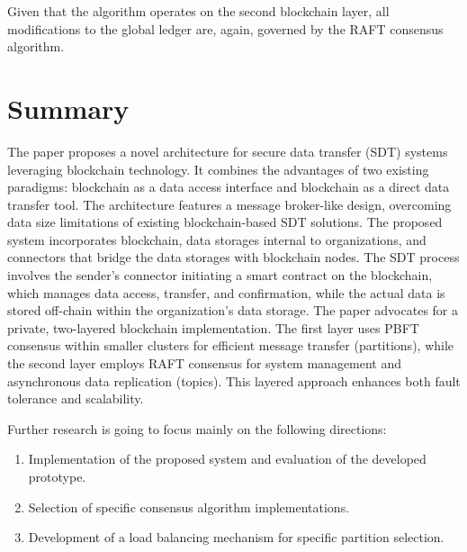 \documentclass[10pt]{llncs}
\begin{document}
Given that the algorithm operates on the second blockchain layer, all modifications to the global ledger are, again, governed by the RAFT consensus algorithm.

\section{Summary} \label{summary}

The paper proposes a novel architecture for secure data transfer (SDT) systems leveraging blockchain technology.
It combines the advantages of two existing paradigms: blockchain as a data access interface and blockchain as a direct data transfer tool.
The architecture features a message broker-like design, overcoming data size limitations of existing blockchain-based SDT solutions.
The proposed system incorporates blockchain, data storages internal to organizations, and connectors that bridge the data storages with blockchain nodes.
The SDT process involves the sender's connector initiating a smart contract on the blockchain, which manages data access, transfer, and confirmation, while the actual data is stored off-chain within the organization's data storage. The paper advocates for a private, two-layered blockchain implementation.
The first layer uses PBFT consensus within smaller clusters for efficient message transfer (partitions), while the second layer employs RAFT consensus for system management and asynchronous data replication (topics).
This layered approach enhances both fault tolerance and scalability.

Further research is going to focus mainly on the following directions:

\begin{enumerate}
    \item Implementation of the proposed system and evaluation of the developed prototype.
    \item Selection of specific consensus algorithm implementations.
    \item Development of a load balancing mechanism for specific partition selection.
\end{enumerate}



\end{document}
